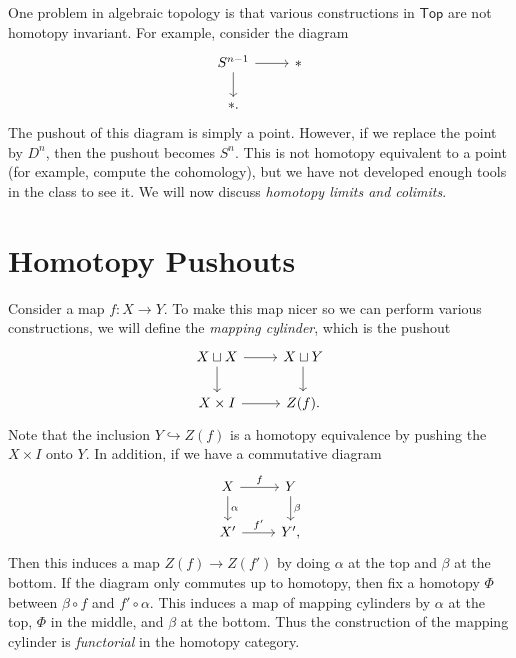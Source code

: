 \documentclass[leqno, openany]{memoir}
\theoremstyle{definition}
\theoremstyle{remark}
\theoremstyle{plain}
\theoremstyle{definition}
\theoremstyle{remark}
\newcommand{\ms}[1]{\mathsf{#1}}
\begin{document}
One problem in algebraic topology is that various constructions in $\ms{Top}$
        are not homotopy invariant. For example, consider the diagram
        \begin{equation} \begin{tikzcd} S^{n-1} \arrow{r} \arrow{d} & * \\ *.
        \end{tikzcd} \end{equation} The pushout of this diagram is simply a
        point. However, if we replace the point by $D^n$, then the pushout
        becomes $S^n$. This is not homotopy equivalent to a point (for example,
        compute the cohomology), but we have not developed enough tools in the
        class to see it. We will now discuss \textit{homotopy limits and
        colimits}.

\section{Homotopy Pushouts}%

Consider a map $f: X \to Y$. To make this map nicer so we can perform various
            constructions, we will define the \textit{mapping cylinder}, which
            is the pushout \begin{equation} \begin{tikzcd} X \sqcup X \arrow{r}
                \arrow{d} & X \sqcup Y \arrow{d} \\ X \times I \arrow{r} &
            Z(f).  \end{tikzcd} \end{equation} Note that the inclusion $Y
            \hookrightarrow Z(f)$ is a homotopy equivalence by pushing the $X
            \times I$ onto $Y$. In addition, if we have a commutative diagram
            \begin{equation} \begin{tikzcd} X \arrow{r}{f} \arrow{d}{\alpha} &
            Y \arrow{d}{\beta} \\ X' \arrow{r}{f'} & Y', \end{tikzcd}
            \end{equation} Then this induces a map $Z(f) \to Z(f')$ by doing
            $\alpha$ at the top and $\beta$ at the bottom. If the diagram only
            commutes up to homotopy, then fix a homotopy $\Phi$ between $\beta
            \circ f$ and $f' \circ \alpha$. This induces a map of mapping
            cylinders by $\alpha$ at the top, $\Phi$ in the middle, and $\beta$
            at the bottom. Thus the construction of the mapping cylinder is
            \textit{functorial} in the homotopy category.
\end{document}
